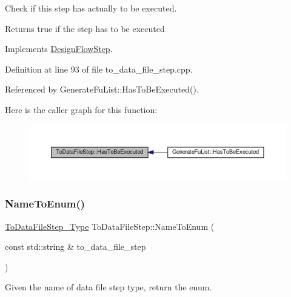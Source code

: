 Check if this step has actually to be executed. 

\begin{DoxyReturn}{Returns}
true if the step has to be executed 
\end{DoxyReturn}


Implements \hyperlink{classDesignFlowStep_a1783abe0c1d162a52da1e413d5d1ef05}{Design\+Flow\+Step}.



Definition at line 93 of file to\+\_\+data\+\_\+file\+\_\+step.\+cpp.



Referenced by Generate\+Fu\+List\+::\+Has\+To\+Be\+Executed().

Here is the caller graph for this function\+:
\nopagebreak
\begin{figure}[H]
\begin{center}
\leavevmode
\includegraphics[width=350pt]{d6/d54/classToDataFileStep_a22c665fe60796cdd10b779df3198cb51_icgraph}
\end{center}
\end{figure}
\mbox{\label{classToDataFileStep_a9cca166c6c49eeb41239edfe3669abf9}} 
\subsubsection{\texorpdfstring{Name\+To\+Enum()}{NameToEnum()}}
{\footnotesize\ttfamily \hyperlink{to__data__file__step_8hpp_a11e82da7dd30bcde03a139fc0baa4f38}{To\+Data\+File\+Step\+\_\+\+Type} To\+Data\+File\+Step\+::\+Name\+To\+Enum (\begin{DoxyParamCaption}\item[{const std\+::string \&}]{to\+\_\+data\+\_\+file\+\_\+step }\end{DoxyParamCaption})\hspace{0.3cm}{\ttfamily [static]}}



Given the name of data file step type, return the enum. 


